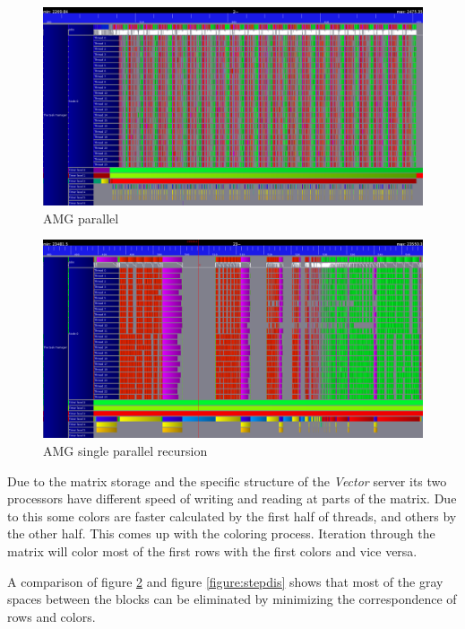 \documentclass[a4paper,11pt]{scrartcl}
\begin{document}
\begin{figure}
    \includegraphics[width=1\textwidth]{iterations_trace.png}
    \caption{AMG parallel}\label{figure:par}
\end{figure}

\begin{figure}
    \includegraphics[width=1\textwidth]{undistributed_coloring_gs.png}
    \caption{AMG single parallel recursion}\label{figure:step}
\end{figure}

Due to the matrix storage and the specific structure of the {\em Vector}\/
server its two processors have different speed of writing and reading at parts
of the matrix. Due to this some colors are faster calculated by the first half
of threads, and others by the other half. This comes up with the coloring process. Iteration through the matrix will color
most of the first rows with the first colors and vice versa.

A comparison of figure \ref{figure:step} and figure \ref{figure:stepdis} shows
that most of the gray spaces between the blocks can be eliminated by minimizing the
correspondence of rows and colors.
\end{document}
